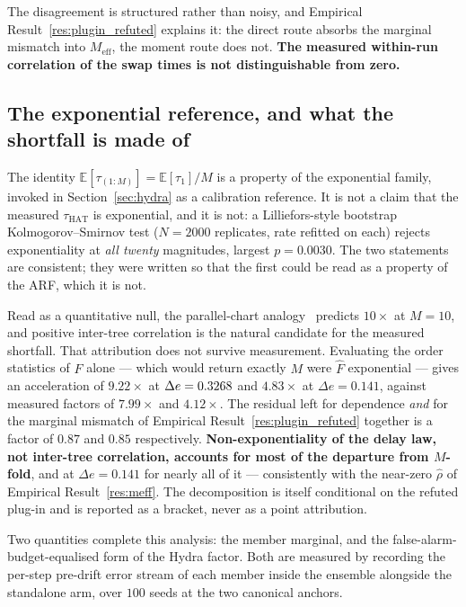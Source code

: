 The disagreement is structured rather than noisy, and Empirical
Result~\ref{res:plugin_refuted} explains it: the direct route absorbs the marginal mismatch into
$M_{\mathrm{eff}}$, the moment route does not. \textbf{The measured within-run correlation of the
swap times is not distinguishable from zero.}

\subsection{The exponential reference, and what the shortfall is made of}\label{sec:dep_exponential}

\begin{remark}\label{rem:exponential_reference}
  The identity $\mathbb{E}[\tau_{(1:M)}] = \mathbb{E}[\tau_1]/M$ is a property of the exponential
  family, invoked in Section~\ref{sec:hydra} as a calibration reference. It is not a claim that the
  measured $\tau_{\mathrm{HAT}}$ is exponential, and it is not: a Lilliefors-style bootstrap
  Kolmogorov--Smirnov test ($N = 2000$ replicates, rate refitted on each) rejects exponentiality at
  \emph{all twenty} magnitudes, largest $p = 0.0030$. The two statements are consistent; they were
  written so that the first could be read as a property of the ARF, which it is not.
\end{remark}

Read as a quantitative null, the parallel-chart analogy~\cite{tartakovsky_2005_multichart} predicts
$10\times$ at $M = 10$, and positive inter-tree correlation is the natural candidate for the measured shortfall. That attribution does not survive measurement. Evaluating the order
statistics of $\widehat{F}$ alone --- which would return exactly $M$ were $\widehat{F}$ exponential
--- gives an acceleration of $9.22\times$ at $\Delta e = 0.3268$ and $4.83\times$ at
$\Delta e = 0.141$, against measured factors of $7.99\times$ and $4.12\times$. The residual left for
dependence \emph{and} for the marginal mismatch of Empirical Result~\ref{res:plugin_refuted}
together is a factor of $0.87$ and $0.85$ respectively. \textbf{Non-exponentiality of the delay law,
not inter-tree correlation, accounts for most of the departure from $M$-fold}, and at
$\Delta e = 0.141$ for nearly all of it --- consistently with the near-zero $\widehat{\rho}$ of
Empirical Result~\ref{res:meff}. The decomposition is itself conditional on the refuted plug-in and
is reported as a bracket, never as a point attribution.

Two quantities complete this analysis: the member marginal, and the false-alarm-budget-equalised
form of the Hydra factor. Both are measured by recording the per-step pre-drift error stream of each
member inside the ensemble alongside the standalone arm, over $100$ seeds at the two canonical
anchors.


